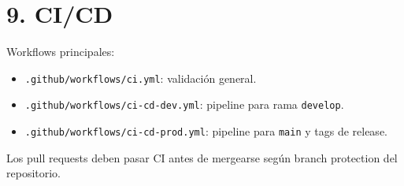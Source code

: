 \documentclass[12pt]{article}
\begin{document}
\section{9. CI/CD}

Workflows principales:

\begin{itemize}
  \item \texttt{.github/workflows/ci.yml}: validación general.
  \item \texttt{.github/workflows/ci-cd-dev.yml}: pipeline para rama \texttt{develop}.
  \item \texttt{.github/workflows/ci-cd-prod.yml}: pipeline para \texttt{main} y tags de release.
\end{itemize}

Los pull requests deben pasar CI antes de mergearse según branch protection del repositorio.
\end{document}

